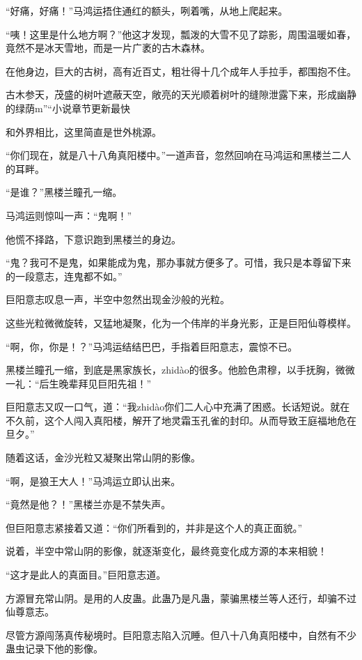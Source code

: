 
\begin{this_body}

“好痛，好痛！”马鸿运捂住通红的额头，咧着嘴，从地上爬起来。

“咦！这里是什么地方啊？”他这才发现，瓢泼的大雪不见了踪影，周围温暖如春，竟然不是冰天雪地，而是一片广袤的古木森林。

在他身边，巨大的古树，高有近百丈，粗壮得十几个成年人手拉手，都围抱不住。

古木参天，茂盛的树叶遮蔽天空，敞亮的天光顺着树叶的缝隙泄露下来，形成幽静的绿荫m”“小说章节更新最快

和外界相比，这里简直是世外桃源。

“你们现在，就是八十八角真阳楼中。”一道声音，忽然回响在马鸿运和黑楼兰二人的耳畔。

“是谁？”黑楼兰瞳孔一缩。

马鸿运则惊叫一声：“鬼啊！”

他慌不择路，下意识跑到黑楼兰的身边。

“鬼？我可不是鬼，如果能成为鬼，那办事就方便多了。可惜，我只是本尊留下来的一段意志，连鬼都不如。”

巨阳意志叹息一声，半空中忽然出现金沙般的光粒。

这些光粒微微旋转，又猛地凝聚，化为一个伟岸的半身光影，正是巨阳仙尊模样。

“啊，你，你是！？”马鸿运结结巴巴，手指着巨阳意志，震惊不已。

黑楼兰瞳孔一缩，到底是黑家族长，zhidào的很多。他脸色肃穆，以手抚胸，微微一礼：“后生晚辈拜见巨阳先祖！”

巨阳意志又叹一口气，道：“我zhidào你们二人心中充满了困惑。长话短说。就在不久前，这个人闯入真阳楼，解开了地灵霜玉孔雀的封印。从而导致王庭福地危在旦夕。”

随着这话，金沙光粒又凝聚出常山阴的影像。

“啊，是狼王大人！”马鸿运立即认出来。

“竟然是他？！”黑楼兰亦是不禁失声。

但巨阳意志紧接着又道：“你们所看到的，并非是这个人的真正面貌。”

说着，半空中常山阴的影像，就逐渐变化，最终竟变化成方源的本来相貌！

“这才是此人的真面目。”巨阳意志道。

方源冒充常山阴。是用的人皮蛊。此蛊乃是凡蛊，蒙骗黑楼兰等人还行，却骗不过仙尊意志。

尽管方源闯荡真传秘境时。巨阳意志陷入沉睡。但八十八角真阳楼中，自然有不少蛊虫记录下他的影像。


\end{this_body}
